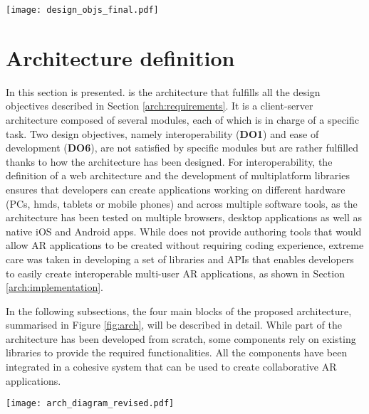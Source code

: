 \begin{figure*}[htbp]
    \centering
    \texttt{[image: design\_objs\_final.pdf]}
    \caption{\fontsize{10pt}{11pt}}
    \label{fig:desobjs}
\end{figure*}

\section{Architecture definition}\label{arch:architecture}

In this section \arch{} is presented. \arch{} is the architecture that fulfills all the design objectives described in Section \ref{arch:requirements}. It is a client-server architecture composed of several modules, each of which is in charge of a specific task. Two design objectives, namely interoperability (\textbf{DO1}) and ease of development (\textbf{DO6}), are not satisfied by specific modules but are rather fulfilled thanks to how the architecture has been designed. For interoperability, the definition of a web architecture and the development of multiplatform libraries ensures that developers can create applications working on different hardware (PCs, \glspl{hmd}, tablets or mobile phones) and across multiple software tools, as the architecture has been tested on multiple browsers, desktop applications as well as native iOS and Android apps. While \arch{} does not provide authoring tools that would allow AR applications to be created without requiring coding experience, extreme care was taken in developing a set of libraries and APIs that enables developers to easily create interoperable multi-user AR applications, as shown in Section \ref{arch:implementation}. 

In the following subsections, the four main blocks of the proposed architecture, summarised in Figure \ref{fig:arch}, will be described in detail. While part of the architecture has been developed from scratch, some components rely on existing libraries to provide the required functionalities. All the components have been integrated in a cohesive system that can be used to create collaborative AR applications.

\begin{figure*}[htbp]
    \centering
    \texttt{[image: arch\_diagram\_revised.pdf]}
    \caption{\fontsize{10pt}{11pt}}
    \label{fig:arch}
\end{figure*}

